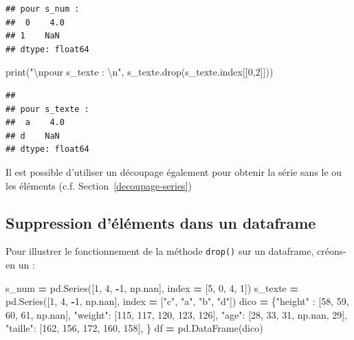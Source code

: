 \documentclass[12pt,]{book}
\newenvironment{Shaded}{\begin{snugshade}}{\end{snugshade}}
\newcommand{\DecValTok}[1]{\textcolor[rgb]{0.00,0.00,0.81}{#1}}
\newcommand{\CharTok}[1]{\textcolor[rgb]{0.31,0.60,0.02}{#1}}
\newcommand{\StringTok}[1]{\textcolor[rgb]{0.31,0.60,0.02}{#1}}
\newcommand{\OperatorTok}[1]{\textcolor[rgb]{0.81,0.36,0.00}{\textbf{#1}}}
\newcommand{\BuiltInTok}[1]{#1}
\newcommand{\NormalTok}[1]{#1}
\numberwithin{equation}{section}
\numberwithin{countremarque}{section}
\begin{document}
\begin{lstlisting}
## pour s_num : 
##  0    4.0
## 1    NaN
## dtype: float64
\end{lstlisting}

\begin{Shaded}
\begin{Highlighting}[]
\BuiltInTok{print}\NormalTok{(}\StringTok{"}\CharTok{\textbackslash{}n}\StringTok{pour s_texte : }\CharTok{\textbackslash{}n}\StringTok{"}\NormalTok{, s_texte.drop(s_texte.index[[}\DecValTok{0}\NormalTok{,}\DecValTok{2}\NormalTok{]]))}
\end{Highlighting}
\end{Shaded}

\begin{lstlisting}
## 
## pour s_texte : 
##  a    4.0
## d    NaN
## dtype: float64
\end{lstlisting}

Il est possible d'utiliser un découpage également pour obtenir la série
sans le ou les éléments (c.f. Section~\ref{decoupage-series})

\subsection{Suppression d'éléments dans un
dataframe}\label{suppression-delements-dans-un-dataframe}

Pour illustrer le fonctionnement de la méthode \texttt{drop()} sur un
dataframe, créons-en un :

\begin{Shaded}
\begin{Highlighting}[]
\NormalTok{s_num }\OperatorTok{=}\NormalTok{ pd.Series([}\DecValTok{1}\NormalTok{, }\DecValTok{4}\NormalTok{, }\OperatorTok{-}\DecValTok{1}\NormalTok{, np.nan],}
\NormalTok{             index }\OperatorTok{=}\NormalTok{ [}\DecValTok{5}\NormalTok{, }\DecValTok{0}\NormalTok{, }\DecValTok{4}\NormalTok{, }\DecValTok{1}\NormalTok{])}
\NormalTok{s_texte }\OperatorTok{=}\NormalTok{ pd.Series([}\DecValTok{1}\NormalTok{, }\DecValTok{4}\NormalTok{, }\OperatorTok{-}\DecValTok{1}\NormalTok{, np.nan],}
\NormalTok{             index }\OperatorTok{=}\NormalTok{ [}\StringTok{"c"}\NormalTok{, }\StringTok{"a"}\NormalTok{, }\StringTok{"b"}\NormalTok{, }\StringTok{"d"}\NormalTok{])}
\NormalTok{dico }\OperatorTok{=}\NormalTok{ \{}\StringTok{"height"}\NormalTok{ : [}\DecValTok{58}\NormalTok{, }\DecValTok{59}\NormalTok{, }\DecValTok{60}\NormalTok{, }\DecValTok{61}\NormalTok{, np.nan],}
        \StringTok{"weight"}\NormalTok{: [}\DecValTok{115}\NormalTok{, }\DecValTok{117}\NormalTok{, }\DecValTok{120}\NormalTok{, }\DecValTok{123}\NormalTok{, }\DecValTok{126}\NormalTok{],}
        \StringTok{"age"}\NormalTok{: [}\DecValTok{28}\NormalTok{, }\DecValTok{33}\NormalTok{, }\DecValTok{31}\NormalTok{, np.nan, }\DecValTok{29}\NormalTok{],}
        \StringTok{"taille"}\NormalTok{: [}\DecValTok{162}\NormalTok{, }\DecValTok{156}\NormalTok{, }\DecValTok{172}\NormalTok{, }\DecValTok{160}\NormalTok{, }\DecValTok{158}\NormalTok{],}
\NormalTok{       \} }
\NormalTok{df }\OperatorTok{=}\NormalTok{ pd.DataFrame(dico)}
\end{Highlighting}
\end{Shaded}
\end{document}
